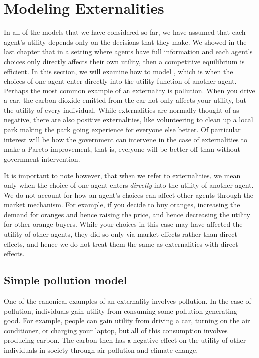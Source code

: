 \section{Modeling Externalities} \label{sec:modeling_externalities}
In all of the models that we have considered so far, we have assumed that each agent's utility depends only on the decisions that they make. We showed in the last chapter that in a setting where agents have full information and each agent's choices only directly affects their own utility, then a competitive equilibrium is efficient. In this section, we will examine how to model , which is when the choices of one agent enter directly into the utility function of another agent. Perhaps the most common example of an externality is pollution. When you drive a car, the carbon dioxide emitted from the car not only affects your utility, but the utility of every individual. While externalities are normally thought of as negative, there are also positive externalities, like volunteering to clean up a local park making the park going experience for everyone else better. Of particular interest will be how the government can intervene in the case of externalities to make a Pareto improvement, that is, everyone will be better off than without government intervention. 

It is important to note however, that when we refer to externalities, we mean only when the choice of one agent enters \emph{directly} into the utility of another agent. We do not account for how an agent's choices can affect other agents through the market mechanism. For example, if you decide to buy oranges, increasing the demand for oranges and hence raising the price, and hence decreasing the utility for other orange buyers. While your choices in this case may have affected the utility of other agents, they did so only via market effects rather than direct effects, and hence we do not treat them the same as externalities with direct effects. 

\subsection*{Simple pollution model}
One of the canonical examples of an externality involves pollution. In the case of pollution, individuals gain utility from consuming some pollution generating good. For example, people can gain utility from driving a car, turning on the air conditioner, or charging your laptop, but all of this consumption involves producing carbon. The carbon then has a negative effect on the utility of other individuals in society through air pollution and climate change. 

